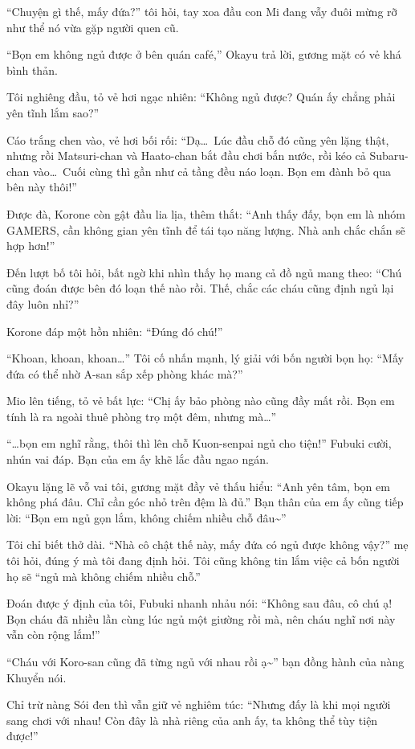 \documentclass[../main.tex]{subfiles}
\begin{document}
``Chuyện gì thế, mấy đứa?'' tôi hỏi, tay xoa đầu con Mi đang vẫy đuôi mừng rỡ như thể nó vừa gặp người quen cũ.

``Bọn em không ngủ được ở bên quán café,'' Okayu trả lời, gương mặt có vẻ khá bình thản.

Tôi nghiêng đầu, tỏ vẻ hơi ngạc nhiên: ``Không ngủ được? Quán ấy chẳng phải yên tĩnh lắm sao?''

Cáo trắng chen vào, vẻ hơi bối rối: ``Dạ\dots\ Lúc đầu chỗ đó cũng yên lặng thật, nhưng rồi Matsuri-chan và Haato-chan bắt đầu chơi bắn nước, rồi kéo cả Subaru-chan vào\dots\ Cuối cùng thì gần như cả tầng đều náo loạn. Bọn em đành bỏ qua bên này thôi!''

Được đà, Korone còn gật đầu lia lịa, thêm thắt: ``Anh thấy đấy, bọn em là nhóm GAMERS, cần không gian yên tĩnh để tái tạo năng lượng. Nhà anh chắc chắn sẽ hợp hơn!''

Đến lượt bố tôi hỏi, bất ngờ khi nhìn thấy họ mang cả đồ ngủ mang theo: ``Chú cũng đoán được bên đó loạn thế nào rồi. Thế, chắc các cháu cũng định ngủ lại đây luôn nhỉ?''

Korone đáp một hồn nhiên: ``Đúng đó chú!''

``Khoan, khoan, khoan\dots'' Tôi cố nhấn mạnh, lý giải với bốn người bọn họ: ``Mấy đứa có thể nhờ A-san sắp xếp phòng khác mà?''

Mio lên tiếng, tỏ vẻ bất lực: ``Chị ấy bảo phòng nào cũng đầy mất rồi. Bọn em tính là ra ngoài thuê phòng trọ một đêm, nhưng mà\dots''

``\dots bọn em nghĩ rằng, thôi thì lên chỗ Kuon-senpai ngủ cho tiện!'' Fubuki cười, nhún vai đáp. Bạn của em ấy khẽ lắc đầu ngao ngán.

Okayu lặng lẽ vỗ vai tôi, gương mặt đầy vẻ thấu hiểu: ``Anh yên tâm, bọn em không phá đâu. Chỉ cần góc nhỏ trên đệm là đủ.'' Bạn thân của em ấy cũng tiếp lời: ``Bọn em ngủ gọn lắm, không chiếm nhiều chỗ đâu\~{}''

Tôi chỉ biết thở dài. ``Nhà cô chật thế này, mấy đứa có ngủ được không vậy?'' mẹ tôi hỏi, đúng ý mà tôi đang định hỏi. Tôi cũng không tin lắm việc cả bốn người họ sẽ ``ngủ mà không chiếm nhiều chỗ.''

Đoán được ý định của tôi, Fubuki nhanh nhảu nói: ``Không sau đâu, cô chú ạ! Bọn cháu đã nhiều lần cùng lúc ngủ một giường rồi mà, nên cháu nghĩ nơi này vẫn còn rộng lắm!''

``Cháu với Koro-san cũng đã từng ngủ với nhau rồi ạ\~{}'' bạn đồng hành của nàng Khuyển nói.

Chỉ trừ nàng Sói đen thì vẫn giữ vẻ nghiêm túc: ``Nhưng đấy là khi mọi người sang chơi với nhau! Còn đây là nhà riêng của anh ấy, ta không thể tùy tiện được!''
\end{document}
